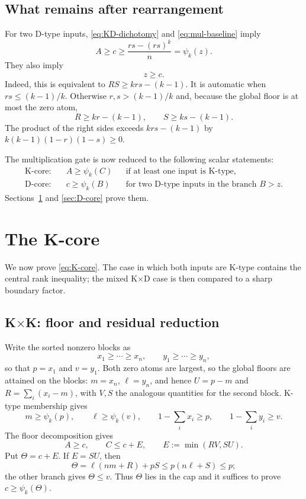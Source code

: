 \documentclass[11pt]{article}
\theoremstyle{definition}
\theoremstyle{remark}
\begin{document}
\subsection{What remains after rearrangement}

For two D-type inputs, \eqref{eq:KD-dichotomy} and
\eqref{eq:mul-baseline} imply
\begin{equation}\label{eq:DD-baseline}
 A\ge c\ge\frac{rs-(rs)^k}{n}=\psi_k(z).
\end{equation}
They also imply
\begin{equation}\label{eq:z-ge-c}
 z\ge c.
\end{equation}
Indeed, this is equivalent to $RS\ge krs-(k-1)$.  It is automatic when
$rs\le(k-1)/k$.  Otherwise $r,s>(k-1)/k$ and, because the global floor is
at most the zero atom,
\[
 R\ge kr-(k-1),\qquad S\ge ks-(k-1).
\]
The product of the right sides exceeds $krs-(k-1)$ by
$k(k-1)(1-r)(1-s)\ge0$.

The multiplication gate is now reduced to the following scalar statements:
\begin{align}
 \text{K-core:}\quad&A\ge\psi_k(C)
 &&\text{if at least one input is K-type},\label{eq:K-core}\\
 \text{D-core:}\quad&c\ge\psi_k(B)
 &&\text{for two D-type inputs in the branch }B>z.
 \label{eq:D-core}
\end{align}
Sections~\ref{sec:K-core} and \ref{sec:D-core} prove them.


\section{The K-core}\label{sec:K-core}

We now prove \eqref{eq:K-core}.  The case in which both inputs are K-type
contains the central rank inequality; the mixed K$\times$D case is then
compared to a sharp boundary factor.

\subsection{\texorpdfstring{K$\times$K}{K x K}: floor and residual reduction}

Write the sorted nonzero blocks as
\[
 x_1\ge\cdots\ge x_n,\qquad y_1\ge\cdots\ge y_n,
\]
so that $p=x_1$ and $v=y_1$.  Both zero atoms are largest, so the global
floors are attained on the blocks: $m=x_n$, $\ell=y_n$, and hence
$U=p-m$ and $R=\sum_i(x_i-m)$, with $V,S$ the analogous quantities for
the second block.  K-type membership gives
\begin{equation}\label{eq:KK-hypotheses}
 m\ge\psi_k(p),\qquad \ell\ge\psi_k(v),\qquad
 1-\sum_i x_i\ge p,\qquad1-\sum_i y_i\ge v.
\end{equation}
The floor decomposition gives
\begin{equation}\label{eq:KK-floor}
 A\ge c,\qquad C\le c+E,\qquad
 E:=\min(RV,SU).
\end{equation}
Put $\Theta=c+E$.  If $E=SU$, then
\[
 \Theta=\ell(nm+R)+pS\le p(n\ell+S)\le p;
\]
the other branch gives $\Theta\le v$.  Thus $\Theta$ lies in the cap and
it suffices to prove $c\ge\psi_k(\Theta)$.
\end{document}
